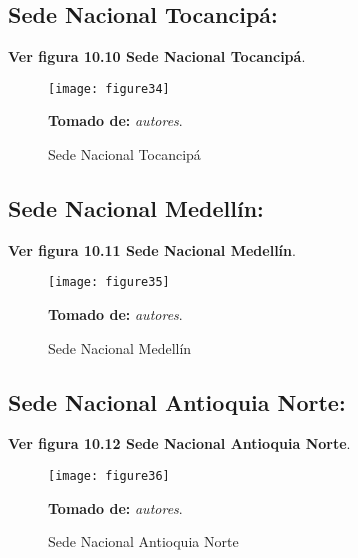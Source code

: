 \subsection{Sede Nacional Tocancipá:} %
\label{sec:Sede Nacional Tocancipá:}

\textbf{Ver figura 10.10 Sede Nacional Tocancipá}.
\begin{figure}[htbp]
  \centering
    {\texttt{[image: figure34]}}%
  \caption{\footnotesize{Sede Nacional Tocancipá}}
   \footnotesize{\textbf{Tomado de:} \textit{autores}.}
  \label{fig:fig2subfig}
\end{figure}

\subsection{Sede Nacional Medellín:} %
\label{sec:Sede Nacional Medellín:}

\textbf{Ver figura 10.11 Sede Nacional Medellín}.
\begin{figure}[htbp]
  \centering
    {\texttt{[image: figure35]}}%
  \caption{\footnotesize{Sede Nacional Medellín}}
   \footnotesize{\textbf{Tomado de:} \textit{autores}.}
  \label{fig:fig2subfig}
\end{figure}

\subsection{Sede Nacional Antioquia Norte:} %
\label{sec:Sede Nacional Antioquia Norte:}

\textbf{Ver figura 10.12 Sede Nacional Antioquia Norte}.
\begin{figure}[htbp]
  \centering
    {\texttt{[image: figure36]}}%
  \caption{\footnotesize{Sede Nacional Antioquia Norte}}
   \footnotesize{\textbf{Tomado de:} \textit{autores}.}
  \label{fig:fig2subfig}
\end{figure}

